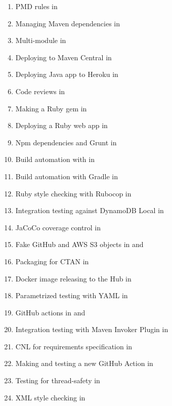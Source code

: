 \documentclass[nobrand,anonymous,nodate,nosecurity]{huawei}
\begin{document}
{\begin{enumerate}
	\item PMD rules in 
	\item Managing Maven dependencies in 
	\item Multi-module  in 
	\item Deploying to Maven Central in 
	\item Deploying Java app to Heroku in 
	\item Code reviews in 
	\item Making a Ruby gem in 
	\item Deploying a Ruby web app in 
	\item Npm dependencies and Grunt in 
	\item Build automation with  in 
	\item Build automation with Gradle in 
	\item Ruby style checking with Rubocop in 
	\item Integration testing against DynamoDB Local in 
	\item JaCoCo coverage control in 
	\item Fake GitHub and AWS S3 objects in  and 
	\item Packaging for CTAN in 
  \item Docker image releasing to the Hub in 
  \item Parametrized testing with YAML in 
  \item GitHub actions in  and 
  \item Integration testing with Maven Invoker Plugin in 
  \item CNL for requirements specification in 
  \item Making and testing a new GitHub Action in 
  \item Testing for thread-safety in 
  \item XML style checking in 

\end{enumerate}}
\end{document}
